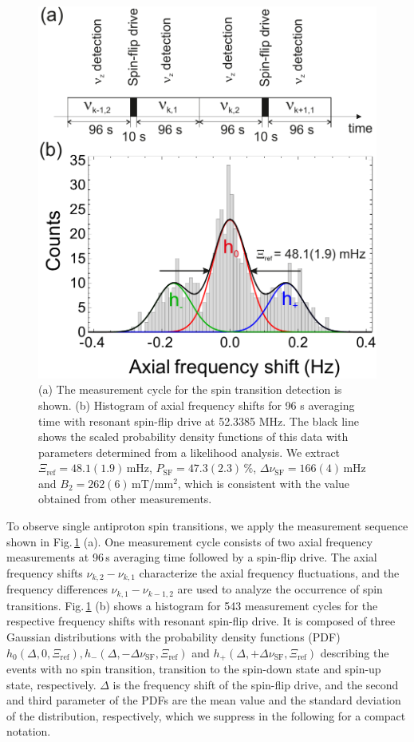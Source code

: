 \documentclass[preprint%
]{elsarticle}
\begin{document}
\begin{figure}[htb]
        \centerline{\includegraphics[width=0.48 \textwidth,keepaspectratio]{FIG3SSF.pdf}}
            \caption[Filter]{ (a) The measurement cycle for the spin transition detection is shown. (b) Histogram of axial frequency shifts for 96 s averaging time with resonant spin-flip drive at 52.3385 MHz. The black line shows the scaled probability density functions of this data with parameters determined from a likelihood analysis. We extract $\Xi_{\mathrm{ref}}=48.1(1.9)\,$mHz, $P_{\mathrm{SF}}=47.3(2.3)\,\%$, $\Delta\nu_{\mathrm{SF}}=166(4)\,$mHz and $B_2 = 262(6)\,$mT/mm$^2$, which is consistent with the value obtained from other measurements.} 
						\label{fig2}
    \end{figure}

To observe single antiproton spin transitions, we apply the measurement sequence shown in Fig.$\,$\ref{fig2} (a). One measurement cycle consists of two axial frequency measurements at 96$\,$s averaging time followed by a spin-flip drive. The axial frequency shifts $\nu_{k,2}-\nu_{k,1}$ characterize the axial frequency fluctuations, and the frequency differences $\nu_{k,1}-\nu_{k-1,2}$ are used to analyze the occurrence of spin transitions. Fig.$\,$\ref{fig2} (b) shows a histogram for 543 measurement cycles for the respective frequency shifts with resonant spin-flip drive. It is composed of three Gaussian distributions with the probability density functions (PDF) $h_0(\Delta,0,\Xi_{\mathrm{ref}}), h_-(\Delta,-\Delta\nu_{\mathrm{SF}},\Xi_{\mathrm{ref}})$ and $h_+(\Delta,+\Delta\nu_{\mathrm{SF}},\Xi_{\mathrm{ref}})$ describing the events with no spin transition, transition to the spin-down state and spin-up state, respectively. $\Delta$ is the frequency shift of the spin-flip drive, and the second and third parameter of the PDFs are the mean value and the standard deviation of the distribution, respectively, which we suppress in the following for a compact notation. 
\end{document}
